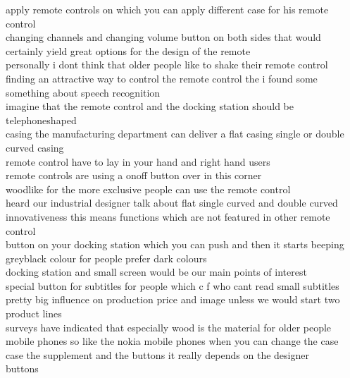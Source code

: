 \documentclass[11pt,a4paper]{article}
\begin{document}
\begin{mdframed}[style=theoremstyle, frametitle={Our System (Baseline) (250 words)}]
apply remote controls on which you can apply different case for his remote control
\\ changing channels and changing volume button on both sides that would certainly yield great options for the design of the remote
\\ personally i dont think that older people like to shake their remote control
\\ finding an attractive way to control the remote control the i found some something about speech recognition
\\ imagine that the remote control and the docking station should be telephoneshaped
\\ casing the manufacturing department can deliver a flat casing single or double curved casing
\\ remote control have to lay in your hand and right hand users
\\ remote controls are using a onoff button over in this corner
\\ woodlike for the more exclusive people can use the remote control
\\ heard our industrial designer talk about flat single curved and double curved
\\ innovativeness this means functions which are not featured in other remote control
\\ button on your docking station which you can push and then it starts beeping
\\ greyblack colour for people prefer dark colours
\\ docking station and small screen would be our main points of interest
\\ special button for subtitles for people which c f who cant read small subtitles
\\ pretty big influence on production price and image unless we would start two product lines
\\ surveys have indicated that especially wood is the material for older people
\\ mobile phones so like the nokia mobile phones when you can change the case
\\ case the supplement and the buttons it really depends on the designer
\\ buttons
\end{mdframed}
\end{document}
